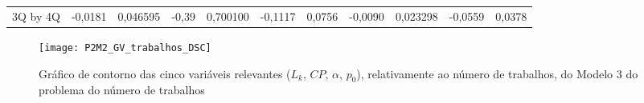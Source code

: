 \begin{table}[H]
{\begin{tabular}{lllllllllll}
\rowcolor[HTML]{FFFFFF} 
3Q by 4Q       & {\color[HTML]{333333} -0,0181}  & {\color[HTML]{333333} 0,046595} & {\color[HTML]{333333} -0,39}    & {\color[HTML]{333333} 0,700100} & {\color[HTML]{333333} -0,1117}  & {\color[HTML]{333333} 0,0756}   & {\color[HTML]{333333} -0,0090}  & {\color[HTML]{333333} 0,023298} & {\color[HTML]{333333} -0,0559}  & {\color[HTML]{333333} 0,0378}  
\end{tabular}
}
\end{table}

\begin{figure}[H]
\caption{Gráfico de contorno das cinco variáveis relevantes ($L_{k}$, $CP$, $\alpha$, $p_{0}$), relativamente ao número de trabalhos, do Modelo 3 do problema do número de trabalhos}
\centering
\texttt{[image: P2M2\_GV\_trabalhos\_DSC]}
\end{figure}

